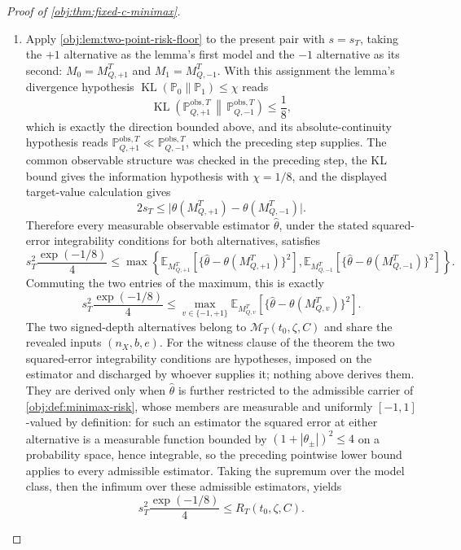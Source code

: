 \documentclass[11pt]{article}
\begin{document}
\begin{proof}[Proof of \cref{obj:thm:fixed-c-minimax}]
\begin{enumerate}
\item Apply \cref{obj:lem:two-point-risk-floor} to the present pair with \(s=s_T\), taking the \(+1\) alternative as the lemma's first model and the \(-1\) alternative as its second: \(M_0=M_{Q,+1}^T\) and \(M_1=M_{Q,-1}^T\). With this assignment the lemma's divergence hypothesis \(\operatorname{KL}(\mathbb P_0\|\mathbb P_1)\le\chi\) reads
\[
\operatorname{KL}\!\left(
\mathbb P_{Q,+1}^{\mathrm{obs},T}
\,\middle\|\,
\mathbb P_{Q,-1}^{\mathrm{obs},T}
\right)
\le
\frac18 ,
\]
which is exactly the direction bounded above, and its absolute-continuity hypothesis reads \(\mathbb P_{Q,+1}^{\mathrm{obs},T}\ll\mathbb P_{Q,-1}^{\mathrm{obs},T}\), which the preceding step supplies. The common observable structure was checked in the preceding step, the KL bound gives the information hypothesis with \(\chi=1/8\), and the displayed target-value calculation gives
\[
2s_T
\le
\bigl|\theta(M_{Q,+1}^T)-\theta(M_{Q,-1}^T)\bigr|.
\]
Therefore every measurable observable estimator \(\widehat\theta\), under the stated squared-error integrability conditions for both alternatives, satisfies
\[
s_T^2\frac{\exp(-1/8)}{4}
\le
\max\left\{
\mathbb E_{M_{Q,+1}^T}\!\left[
\{\widehat\theta-\theta(M_{Q,+1}^T)\}^2
\right],
\mathbb E_{M_{Q,-1}^T}\!\left[
\{\widehat\theta-\theta(M_{Q,-1}^T)\}^2
\right]
\right\}.
\]
Commuting the two entries of the maximum, this is exactly
\[
s_T^2\frac{\exp(-1/8)}{4}
\le
\max_{v\in\{-1,+1\}}
\mathbb E_{M_{Q,v}^T}\!\left[
\{\widehat\theta-\theta(M_{Q,v}^T)\}^2
\right].
\]
The two signed-depth alternatives belong to \(\mathcal M_T(t_0,\zeta,C)\) and share the revealed inputs \((n_X,b,e)\). For the witness clause of the theorem the two squared-error integrability conditions are hypotheses, imposed on the estimator and discharged by whoever supplies it; nothing above derives them. They are derived only when \(\widehat\theta\) is further restricted to the admissible carrier of \cref{obj:def:minimax-risk}, whose members are measurable and uniformly \([-1,1]\)-valued by definition: for such an estimator the squared error at either alternative is a measurable function bounded by \((1+|\theta_\pm|)^2\le4\) on a probability space, hence integrable, so the preceding pointwise lower bound applies to every admissible estimator. Taking the supremum over the model class, then the infimum over these admissible estimators, yields
\[
s_T^2\frac{\exp(-1/8)}{4}
\le
R_T(t_0,\zeta,C).
\] %


\end{enumerate}
\end{proof}
\end{document}
